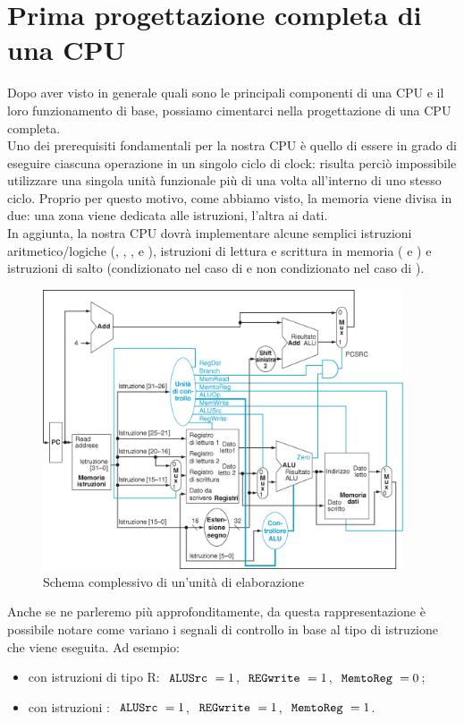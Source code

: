 \documentclass[class=book, crop=false, oneside]{standalone}
\begin{document}
\section{Prima progettazione completa di una CPU}
Dopo aver visto in generale quali sono le principali componenti di una CPU e il loro funzionamento di base, possiamo cimentarci nella progettazione di una CPU completa.\\
Uno dei prerequisiti fondamentali per la nostra CPU è quello di essere in grado di eseguire ciascuna operazione in un singolo ciclo di clock: risulta perciò impossibile utilizzare una singola unità funzionale più di una volta all'interno di uno stesso ciclo. Proprio per questo motivo, come abbiamo visto, la memoria viene divisa in due: una zona viene dedicata alle istruzioni, l'altra ai dati.\\
In aggiunta, la nostra CPU dovrà implementare alcune semplici istruzioni aritmetico/logiche (, , ,  e ), istruzioni di lettura e scrittura in memoria ( e ) e istruzioni di salto (condizionato nel caso di  e non condizionato nel caso di ).

\begin{figure}[H]
	\centering
	\includegraphics[width=0.95\textwidth,keepaspectratio]{schema_complessivo.png}
	\caption{Schema complessivo di un'unità di elaborazione}
\end{figure}
Anche se ne parleremo più approfonditamente, da questa rappresentazione è possibile notare come variano i segnali di controllo in base al tipo di istruzione che viene eseguita. Ad esempio:
\begin{itemize}
	\item con istruzioni di tipo R: \(\textrm{ \texttt{ALUSrc} }=1\), \(\textrm{ \texttt{REGwrite} }= 1\), \(\textrm{ \texttt{MemtoReg} }=0\);
	\item con istruzioni : \(\textrm{ \texttt{ALUSrc} }=1\), \(\textrm{ \texttt{REGwrite} }= 1\), \(\textrm{ \texttt{MemtoReg} }=1\).
\end{itemize}
\end{document}
